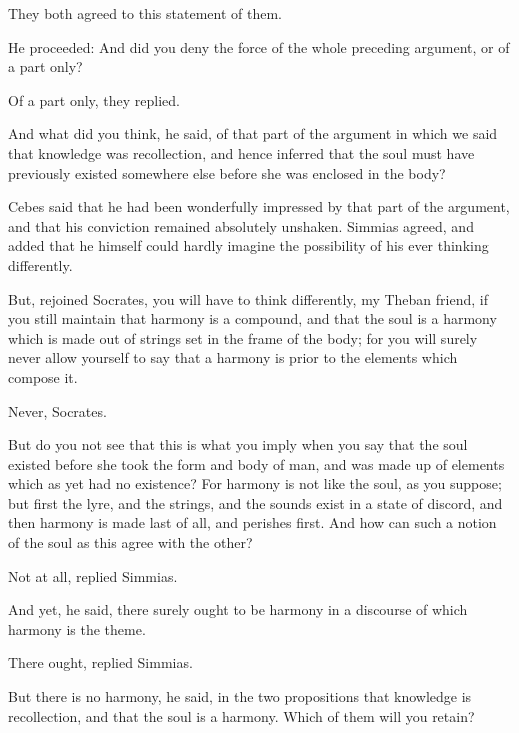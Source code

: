 \documentclass[11pt,letter]{article}
\begin{document}
\par  They both agreed to this statement of them.

\par  He proceeded: And did you deny the force of the whole preceding argument, or of a part only?

\par  Of a part only, they replied.

\par  And what did you think, he said, of that part of the argument in which we said that knowledge was recollection, and hence inferred that the soul must have previously existed somewhere else before she was enclosed in the body?

\par  Cebes said that he had been wonderfully impressed by that part of the argument, and that his conviction remained absolutely unshaken. Simmias agreed, and added that he himself could hardly imagine the possibility of his ever thinking differently.

\par  But, rejoined Socrates, you will have to think differently, my Theban friend, if you still maintain that harmony is a compound, and that the soul is a harmony which is made out of strings set in the frame of the body; for you will surely never allow yourself to say that a harmony is prior to the elements which compose it.

\par  Never, Socrates.

\par  But do you not see that this is what you imply when you say that the soul existed before she took the form and body of man, and was made up of elements which as yet had no existence? For harmony is not like the soul, as you suppose; but first the lyre, and the strings, and the sounds exist in a state of discord, and then harmony is made last of all, and perishes first. And how can such a notion of the soul as this agree with the other?

\par  Not at all, replied Simmias.

\par  And yet, he said, there surely ought to be harmony in a discourse of which harmony is the theme.

\par  There ought, replied Simmias.

\par  But there is no harmony, he said, in the two propositions that knowledge is recollection, and that the soul is a harmony. Which of them will you retain?
\end{document}
